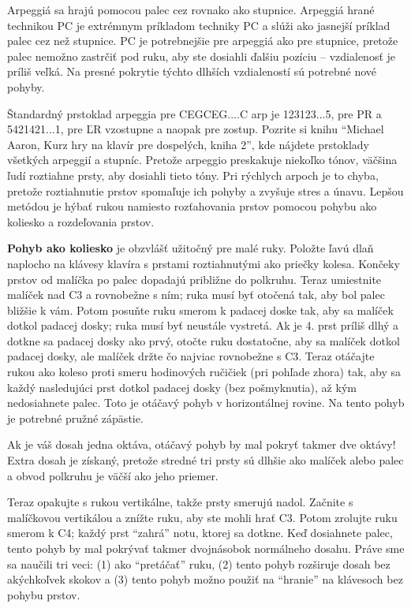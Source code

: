 \documentclass[11pt,a4paper]{book}
\begin{document}
Arpeggiá sa hrajú pomocou palec cez rovnako ako stupnice. Arpeggiá hrané technikou PC je extrémnym príkladom techniky PC a slúži ako jasnejší príklad palec cez než stupnice. PC je potrebnejšie pre arpeggiá ako pre stupnice, pretože palec nemožno zastrčiť pod ruku, aby ste dosiahli ďalšiu pozíciu -- vzdialenosť je príliš veľká. Na presné pokrytie týchto dlhších vzdialeností sú potrebné nové pohyby.

Štandardný prstoklad arpeggia pre CEGCEG....C arp je 123123...5, pre PR a 5421421...1, pre ĽR vzostupne a naopak pre zostup. Pozrite si knihu “Michael Aaron, Kurz hry na klavír pre dospelých, kniha 2”, kde nájdete prstoklady všetkých arpeggií a stupníc. Pretože arpeggio preskakuje niekoľko tónov, väčšina ľudí roztiahne prsty, aby dosiahli tieto tóny. Pri rýchlych arpoch je to chyba, pretože roztiahnutie prstov spomaľuje ich pohyby a zvyšuje stres a únavu. Lepšou metódou je hýbať rukou namiesto rozťahovania prstov pomocou pohybu ako koliesko a rozdeľovania prstov.

\textbf{Pohyb ako koliesko} je obzvlášť užitočný pre malé ruky. Položte ľavú dlaň naplocho na klávesy klavíra s prstami roztiahnutými ako priečky kolesa. Končeky prstov od malíčka po palec dopadajú približne do polkruhu. Teraz umiestnite malíček nad C3 a rovnobežne s ním; ruka musí byť otočená tak, aby bol palec bližšie k vám. Potom posuňte ruku smerom k padacej doske tak, aby sa malíček dotkol padacej dosky; ruka musí byť neustále vystretá. Ak je 4. prst príliš dlhý a dotkne sa padacej dosky ako prvý, otočte ruku dostatočne, aby sa malíček dotkol padacej dosky, ale malíček držte čo najviac rovnobežne s C3. Teraz otáčajte rukou ako koleso proti smeru hodinových ručičiek (pri pohľade zhora) tak, aby sa každý nasledujúci prst dotkol padacej dosky (bez pošmyknutia), až kým nedosiahnete palec. Toto je otáčavý pohyb v horizontálnej rovine. Na tento pohyb je potrebné pružné zápästie.

Ak je váš dosah jedna oktáva, otáčavý pohyb by mal pokryť takmer dve oktávy! Extra dosah je získaný, pretože stredné tri prsty sú dlhšie ako malíček alebo palec a obvod polkruhu je väčší ako jeho priemer.

Teraz opakujte s rukou vertikálne, takže prsty smerujú nadol. Začnite s malíčkovou vertikálou a znížte ruku, aby ste mohli hrať C3. Potom zrolujte ruku smerom k C4; každý prst “zahrá” notu, ktorej sa dotkne. Keď dosiahnete palec, tento pohyb by mal pokrývať takmer dvojnásobok normálneho dosahu. Práve sme sa naučili tri veci: (1) ako “pretáčať” ruku, (2) tento pohyb rozširuje dosah bez akýchkoľvek skokov a (3) tento pohyb možno použiť na “hranie” na klávesoch bez pohybu prstov.
\end{document}

